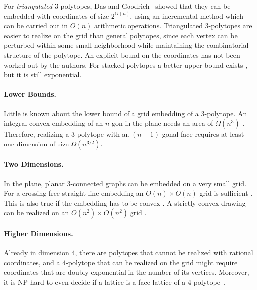 \documentclass{article}
\theoremstyle{plain} \newtheorem{thm}{Theorem}[section]
\begin{document}
For \emph{triangulated} 3-polytopes,
Das and Goodrich~\cite{dg-copdc-97} showed that they can be embedded with coordinates of size $2^{O(n)}$, using an incremental method which can be carried out in $O(n)$ arithmetic operations.
Triangulated 3-polytopes are easier to realize on the grid than general polytopes, since each
vertex can be perturbed within some small neighborhood while
maintaining the combinatorial structure of the polytope. An explicit
bound on the coordinates has not been worked out by the authors.  For
stacked polytopes a better upper bound exists \cite{z-gcsg-07}, but it
is still exponential.

\paragraph{Lower Bounds.}
Little is known about the lower bound of a grid embedding of a 3-polytope. 
An integral convex embedding of an $n$-gon in the plane needs
an area of $\Omega(n^{3})$ \cite{az-mnecd-95,a-lbvsc-61,t-ep-91,vk-mnecd-82}.
Therefore, realizing a 3-polytope with an $(n-1)$-gonal face requires
at least one dimension of size $\Omega(n^{3/2})$.

\paragraph{Two Dimensions.}
In the plane, planar 3-connected graphs  can be embedded on a very small grid.
For a crossing-free straight-line embedding  an $O(n)\times O(n)$ grid
is sufficient \cite{fpp-hdpgg-90,s-epgg-90}.
This is also true if the embedding has to be convex
\cite{bfm-cdpg-06}. A
strictly convex drawing can be realized on an $O(n^2)\times
O(n^2)$ grid \cite{br-scdpg-06}.
\paragraph{Higher Dimensions.}
Already in dimension 4, there are polytopes that cannot be realized
with rational coordinates, and a 4-polytope that can be realized
on the grid might require coordinates that are doubly exponential in
the number of its vertices. Moreover, it is NP-hard to even decide
if a lattice is a face lattice of a
4-polytope~\cite{rg-rsp-96,gz-rspu-95}.
\end{document}
